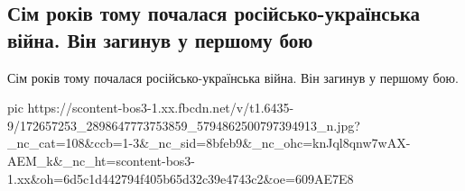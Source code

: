  
 
 
 
 

\subsection{Сім років тому почалася російсько-українська війна.  Він загинув у першому бою}
\label{sec:13_04_2021.fb.makarenko_oksana.2.vojna_ukraina_rossia_smert_boj}

Сім років тому почалася російсько-українська війна.  Він загинув у першому бою.

\ifcmt
  pic https://scontent-bos3-1.xx.fbcdn.net/v/t1.6435-9/172657253_2898647773753859_5794862500797394913_n.jpg?_nc_cat=108&ccb=1-3&_nc_sid=8bfeb9&_nc_ohc=knJql8qnw7wAX-AEM_k&_nc_ht=scontent-bos3-1.xx&oh=6d5c1d442794f405b65d32c39e4743c2&oe=609AE7E8
\fi

